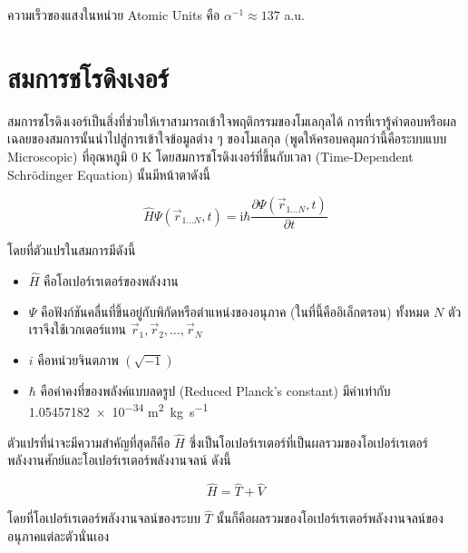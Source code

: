 \noindent ความเร็วของแสงในหน่วย Atomic Units คือ $\alpha^{-1}\approx 137$ a.u.

\section{สมการชโรดิงเงอร์}

สมการชโรดิงเงอร์เป็นสิ่งที่ช่วยให้เราสามารถเข้าใจพฤติกรรมของโมเลกุลได้ การที่เรารู้คำตอบหรือผลเฉลยของสมการนั้นนำไปสู่การเข้าใจข้อมูลต่าง ๆ
ของโมเลกุล (พูดให้ครอบคลุมกว่านี้คือระบบแบบ Microscopic) ที่อุณหภูมิ 0 K โดยสมการชโรดิงเงอร์ที่ขึ้นกับเวลา (Time-Dependent
Schr\"{o}dinger Equation) นั้นมีหน้าตาดังนี้

\begin{equation}
  \label{eq:time_dependent_schrodinger}
  \hat{H} \Psi\left(\vec{r}_{1 \ldots N}, t\right)
  =
  \mathrm{i} \hbar
  \frac
  {
    \partial \Psi\left(\vec{r}_{1 \ldots N}, t\right)
  }
  {
    \partial t
  }
\end{equation}

\noindent โดยที่ตัวแปรในสมการมีดังนี้
\begin{itemize}[topsep=0pt,noitemsep]
  \setlength\itemsep{1em}
  \item $\hat{H}$ คือโอเปอร์เรเตอร์ของพลังงาน

  \item $\Psi$ คือฟังก์ชันคลื่นที่ขึ้นอยู่กับพิกัดหรือตำแหน่งของอนุภาค (ในที่นี้คืออิเล็กตรอน) ทั้งหมด $N$ ตัว เราจึงใช้เวกเตอร์แทน
        $\vec{r}_{1}, \vec{r}_{2}, \dots, \vec{r}_{N}$

  \item $i$ คือหน่วยจินตภาพ $(\sqrt{-1})$

  \item $\hbar$ คือค่าคงที่ของพลังค์แบบลดรูป (Reduced Planck's constant) มีค่าเท่ากับ
        \num{1.05457182e-34} \si{m^{2}.kg.s^{-1}}
\end{itemize}

ตัวแปรที่น่าจะมีความสำคัญที่สุดก็คือ $\hat{H}$ ซึ่งเป็นโอเปอร์เรเตอร์ที่เป็นผลรวมของโอเปอร์เรเตอร์พลังงานศักย์และโอเปอร์เรเตอร์พลังงานจลน์
ดังนี้

\begin{equation}
  \label{eq:hamiltonian_operator}
  \hat{H} = \hat{T}+\hat{V}
\end{equation}

\noindent โดยที่โอเปอร์เรเตอร์พลังงานจลน์ของระบบ $\hat{T}$ นั้นก็คือผลรวมของโอเปอร์เรเตอร์พลังงานจลน์ของอนุภาคแต่ละตัวนั่นเอง

